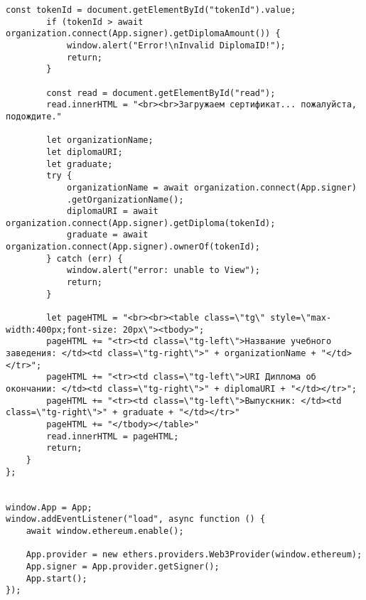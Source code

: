 \begin{lstlisting}[caption=Создание и чтение сертификата с помощью клиентского приложения, label = list4, style=realcode]
		const tokenId = document.getElementById("tokenId").value;
		if (tokenId > await organization.connect(App.signer).getDiplomaAmount()) {
			window.alert("Error!\nInvalid DiplomaID!");
			return;
		}
		
		const read = document.getElementById("read");
		read.innerHTML = "<br><br>Загружаем сертификат... пожалуйста, подождите."
		
		let organizationName;
		let diplomaURI;
		let graduate;
		try {
			organizationName = await organization.connect(App.signer)
			.getOrganizationName();
			diplomaURI = await organization.connect(App.signer).getDiploma(tokenId);
			graduate = await organization.connect(App.signer).ownerOf(tokenId);
		} catch (err) {
			window.alert("error: unable to View");
			return;
		}
		
		let pageHTML = "<br><br><table class=\"tg\" style=\"max-width:400px;font-size: 20px\"><tbody>";
		pageHTML += "<tr><td class=\"tg-left\">Название учебного заведения: </td><td class=\"tg-right\">" + organizationName + "</td></tr>";
		pageHTML += "<tr><td class=\"tg-left\">URI Диплома об окончании: </td><td class=\"tg-right\">" + diplomaURI + "</td></tr>";
		pageHTML += "<tr><td class=\"tg-left\">Выпускник: </td><td class=\"tg-right\">" + graduate + "</td></tr>"
		pageHTML += "</tbody></table>"
		read.innerHTML = pageHTML;
		return;
	}
};


window.App = App;
window.addEventListener("load", async function () {
	await window.ethereum.enable();
	
	App.provider = new ethers.providers.Web3Provider(window.ethereum);
	App.signer = App.provider.getSigner();
	App.start();
});

\end{lstlisting}


